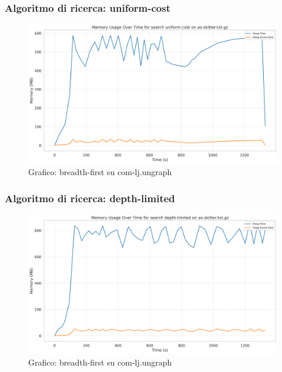 \documentclass{article}
\begin{document}
\subsubsection{Algoritmo di ricerca: uniform-cost}
\begin{figure}[h]\centering
	\includegraphics[width=\textwidth]{../plots/as-skitter_uniform-cost.png}
	\caption{Grafico: breadth-first su com-lj.ungraph}
\end{figure}
\subsubsection{Algoritmo di ricerca: depth-limited}
\begin{figure}[h]\centering
	\includegraphics[width=\textwidth]{../plots/as-skitter_depth-limited.png}
	\caption{Grafico: breadth-first su com-lj.ungraph}
\end{figure}
\end{document}
